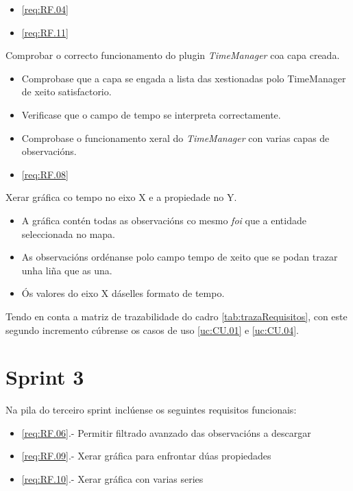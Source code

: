 		  {\begin{itemize}\item \ref{req:RF.04} \item \ref{req:RF.11} \end{itemize}} %
		  {Comprobar o correcto funcionamento do plugin \emph{TimeManager} coa capa creada.} %
		  {\begin{itemize}
		  \item Comprobase que a capa se engada a lista das xestionadas polo TimeManager de xeito satisfactorio.
		  \item Verificase que o campo de tempo se interpreta correctamente.
		  \item Comprobase o funcionamento xeral do \emph{TimeManager} con varias capas de observacións.
		  \end{itemize}} %
		  
		  {\begin{itemize}\item \ref{req:RF.08} \\\end{itemize}} %
		  {Xerar gráfica co tempo no eixo X e a propiedade no Y.} %
		  {\begin{itemize}
		  \item A gráfica contén todas as observacións co mesmo \emph{foi} que a entidade seleccionada no mapa.
		  \item As observacións ordénanse polo campo tempo de xeito que se podan trazar unha liña que as una.
		  \item Ós valores do eixo X dáselles formato de tempo.
		  \end{itemize}} %
		  
Tendo en conta a matriz de trazabilidade do cadro \ref{tab:trazaRequisitos}, con este segundo incremento cúbrense os casos de uso \ref{uc:CU.01} e \ref{uc:CU.04}.
		  
\section{Sprint 3}
Na pila do terceiro sprint inclúense os seguintes requisitos funcionais:
\begin{itemize}
\item \ref{req:RF.06}.- Permitir filtrado avanzado das observacións a descargar
\item \ref{req:RF.09}.- Xerar gráfica para enfrontar dúas propiedades
\item \ref{req:RF.10}.- Xerar gráfica con varias series
\end{itemize}

